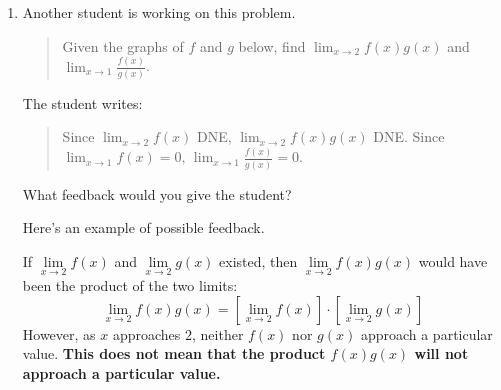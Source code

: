 \documentclass{article}
\begin{document}
\begin{enumerate}
\begin{enumerate}
\begin{solution}
    \end{solution}

  \item
    \begin{problem}[\vfill\newpage]
      Another student is working on this problem.
      \begin{quote}
        Given the graphs of $f$ and $g$ below, find $\displaystyle \lim_{x \to 2} f(x) g(x)$ and $\displaystyle \lim_{x \to 1} \frac{f(x)}{g(x)}$.
        \begin{center}
          \hspace{0.5in}
        \end{center}
      \end{quote}
      The student writes:
      \begin{quote}
        Since $\displaystyle \lim_{x \to 2} f(x)$ DNE, $\displaystyle \lim_{x \to 2} f(x) g(x)$ DNE. Since $\displaystyle \lim_{x \to 1} f(x) = 0$, $\displaystyle \lim_{x \to 1} \frac{f(x)}{g(x)} = 0$.
      \end{quote}
      What feedback would you give the student?
    \end{problem}

    \begin{solution}
      Here's an example of possible feedback.

      If $\lim\limits_{x\to 2} f(x)$ and $\lim\limits_{x\to 2} g(x)$
      existed, then $\lim\limits_{x\to 2} f(x)g(x)$ would have been the product
      of the two limits:
      \[\lim_{x \to 2} f(x)g(x) = \left[\lim_{x \to 2}f(x)\right] \cdot
      \left[\lim_{x \to 2} g(x) \right]
      \]
      However, as $x$ approaches $2$, neither $f(x)$ nor $g(x)$ approach a
      particular value. \textbf{This does not mean that the product
      $f(x)g(x)$ will
      not approach a particular value.}


\end{solution}
\end{enumerate}
\end{enumerate}
\end{document}
